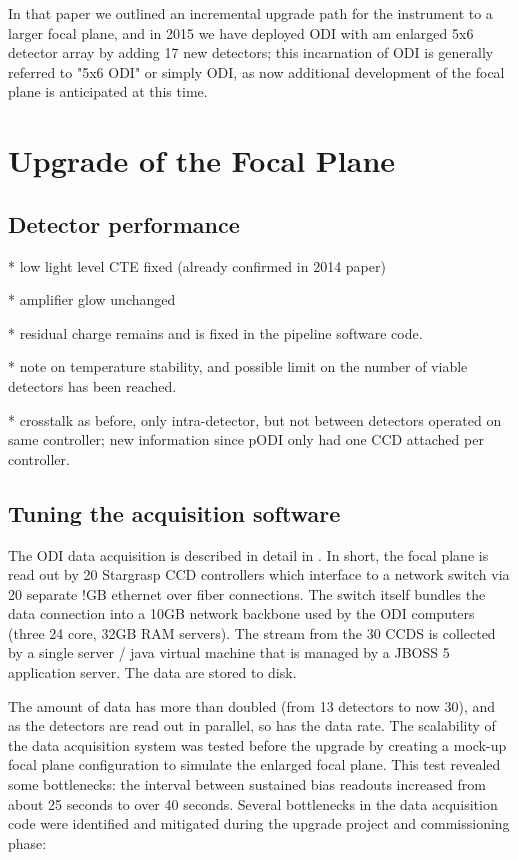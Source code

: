\documentclass[]{spieman}
\begin{document}
In that paper we outlined an incremental upgrade path for the instrument to a larger focal plane, 
and in 2015 we have deployed ODI with am enlarged 5x6 detector array by adding 17 new detectors; 
this incarnation of ODI is generally referred to "5x6 ODI" or simply ODI, as now additional 
development of the focal plane is anticipated at this time.


\section{Upgrade of the Focal Plane}

\subsection{Detector performance}

* low light level CTE fixed (already confirmed in 2014 paper)

* amplifier glow unchanged

* residual charge remains and is fixed in the pipeline software code.  

\cite{Lesser2012}

* note on temperature stability, and possible limit on the number of viable detectors has been 
reached.

* crosstalk as before, only intra-detector, but not between detectors operated on same controller; 
new information since pODI only had one CCD attached per controller. 



\subsection{Tuning the acquisition software}

The ODI data acquisition is described in detail in \cite{Yeatts2008,Yeatts2010}.
In short, the focal plane is read out by 20 Stargrasp CCD controllers which
interface to a network switch via 20 separate !GB ethernet over fiber
connections. The switch itself bundles the data connection into a 10GB network
backbone used by the ODI computers (three 24 core, 32GB RAM servers). The stream
from the 30 CCDS is collected by a single server / java virtual machine that is
managed by a JBOSS 5 application server. The data are stored to disk.

The amount of data has more than doubled (from 13 detectors to now 30), and as
the detectors are read out in parallel, so has the data rate. The scalability of
the data acquisition system was tested before the upgrade by creating a mock-up
focal plane  configuration to simulate the enlarged focal plane. This test
revealed some bottlenecks: the interval between sustained bias readouts
increased from about 25 seconds to over 40 seconds. Several bottlenecks in the
data acquisition code were identified and mitigated during the upgrade project
and commissioning phase:
\end{document}
